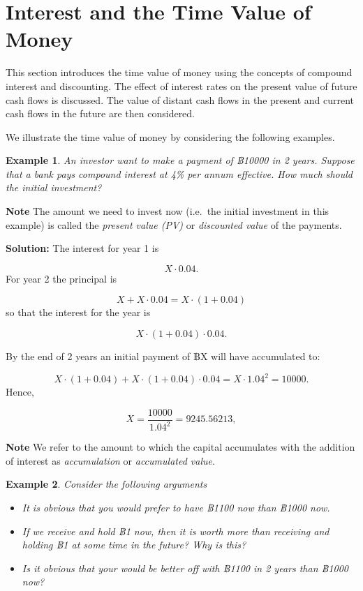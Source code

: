 \documentclass[
]{book}
\theoremstyle{definition}
\theoremstyle{definition}
\newtheorem{example}{Example}[chapter]
\theoremstyle{definition}
\theoremstyle{definition}
\theoremstyle{remark}
\begin{document}
\hypertarget{interest-and-the-time-value-of-money}{%
\section{Interest and the Time Value of Money}\label{interest-and-the-time-value-of-money}}

This section introduces the time value of money using the concepts of
compound interest and discounting. The effect of interest rates on the
present value of future cash flows is discussed. The value of distant
cash flows in the present and current cash flows in the future are then
considered.

We illustrate the time value of money by considering the following
examples.

\begin{example}
\protect\hypertarget{exm:egpv}{}\label{exm:egpv}\emph{An investor want to make a payment of ฿10000 in 2 years. Suppose that a
bank pays compound interest at 4\% per annum effective. How much should
the initial investment?}
\end{example}

\textbf{Note} The amount we need to invest now (i.e.~the initial investment
in this example) is called the \emph{present value (PV)} or \emph{discounted
value} of the payments.

\textbf{Solution:} The interest for year 1 is

\[ X \cdot 0.04.\] For year 2 the principal is

\[ X + X \cdot 0.04 = X \cdot (1 + 0.04)\] so that the interest for the
year is

\[ X \cdot (1 + 0.04) \cdot 0.04.\]

By the end of 2 years an initial payment of ฿X will have accumulated to:

\[X\cdot (1 + 0.04) + X \cdot (1 + 0.04) \cdot 0.04 =   X  \cdot  1.04^2 = 10000.\]
Hence,

\[X = \frac{10000}{1.04^2} = 9245.56213,\]

\textbf{Note} We refer to the amount to which the capital accumulates with
the addition of interest as \emph{accumulation} or \emph{accumulated value}.

\begin{example}

\emph{Consider the following arguments}

\begin{itemize}
\item
  \emph{It is obvious that you would prefer to have ฿1100 now than ฿1000
  now.}
\item
  \emph{If we receive and hold ฿1 now, then it is worth more than receiving
  and holding ฿1 at some time in the future? Why is this?}
\item
  \emph{Is it obvious that your would be better off with ฿1100 in 2 years
  than ฿1000 now?}
\end{itemize}

\end{example}
\end{document}
